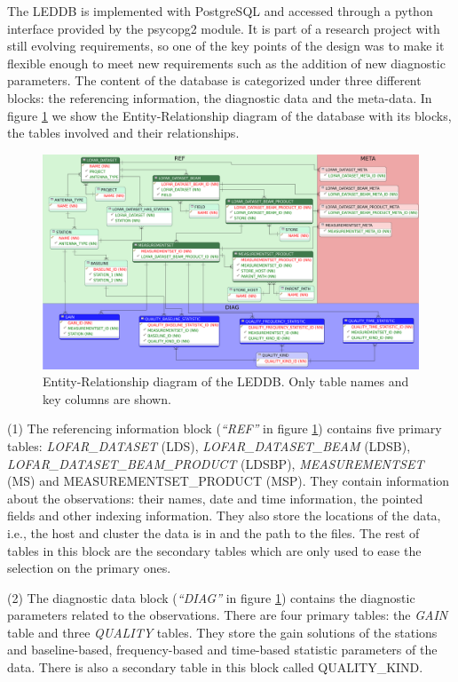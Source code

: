 \documentclass[11pt,twoside]{article}
\begin{document}
The LEDDB is implemented with PostgreSQL and accessed through a python interface provided by the psycopg2 module. It is part of a research project with still evolving requirements, so one of the key points of the design was to make it flexible enough to meet new requirements such as the addition of new diagnostic parameters. The content of the database is categorized under three different blocks: the referencing information, the diagnostic data and the meta-data. In figure \ref{fig:leddber} we show the Entity-Relationship diagram of the database with its blocks, the tables involved and their relationships.
\begin{figure}[!ht]
  \centering
    \includegraphics[scale=0.077]{O23_f1.eps} 
  \caption{Entity-Relationship diagram of the LEDDB. Only table names and key columns are shown.}
  \label{fig:leddber}
\end{figure}

(1) The referencing information block (\textit{``REF''} in figure \ref{fig:leddber}) contains five primary tables: \textit{LOFAR\-\_DATA\-SET} (LDS), \textit{LOFAR\-\_DATA\-SET\-\_BEAM} (LDSB), \textit{LOFAR\-\_DATA\-SET\-\_BEAM\-\_PRODUCT} (LDSBP), \textit{MEA\-SU\-RE\-MENT\-SET} (MS) and {MEA\-SU\-RE\-MENT\-SET\-\_PRODUCT} (MSP). They contain information about the observations: their names, date and time information, the pointed fields and other indexing information. They also store the locations of the data, i.e., the host and cluster the data is in and the path to the files. The rest of tables in this block are the secondary tables which are only used to ease the selection on the primary ones.

(2) The diagnostic data block (\textit{``DIAG''} in figure \ref{fig:leddber}) contains the diagnostic parameters related to the observations. There are four primary tables: the \textit{GAIN} table and three \textit{QUALITY} tables. They store the gain solutions of the stations and baseline-based, frequency-based and time-based statistic parameters of the data. There is also a secondary table in this block called QUA\-LI\-TY\-\_KIND.
\end{document}
